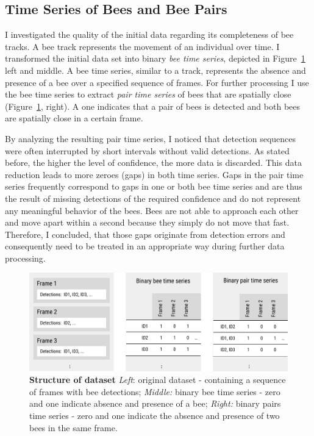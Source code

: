 \subsection{Time Series of Bees and Bee Pairs}
\label{subsec:tracking}
I investigated the quality of the initial data regarding its completeness of bee tracks.
A bee track represents the movement of an individual over time.
I transformed the initial data set into binary \emph{bee time series}, depicted in Figure~\ref{fig:structure} left and middle.
A bee time series, similar to a track, represents the absence and presence of a bee over a specified sequence of frames.
For further processing I use the bee time series to extract \emph{pair time series} of bees that are spatially close (Figure~\ref{fig:structure}, right).
A one indicates that a pair of bees is detected and both bees are spatially close in a certain frame.

By analyzing the resulting pair time series, I noticed that detection sequences were often interrupted by short intervals without valid detections.
As stated before, the higher the level of confidence, the more data is discarded.
This data reduction leads to more zeroes (gaps) in both time series.
Gaps in the pair time series frequently correspond to gaps in one or both bee time series and are thus the result of missing detections of the required confidence and do not represent any meaningful behavior of the bees.
Bees are not able to approach each other and move apart within a second because they simply do not move that fast.
Therefore, I concluded, that those gaps originate from detection errors and consequently need to be treated in an appropriate way during further data processing.

\begin{figure}[tp]
	\centering
	\includegraphics[width=1.0\textwidth]{Figures/structure}
	\caption[Structure of dataset]{\textbf{Structure of dataset} \emph{Left}: original dataset - containing a sequence of frames with bee detections; \emph{Middle:} binary bee time series - zero and one indicate absence and presence of a bee; \emph{Right:} binary pairs time series - zero and one indicate the absence and presence of two bees in the same frame.}
	\label{fig:structure}
\end{figure}